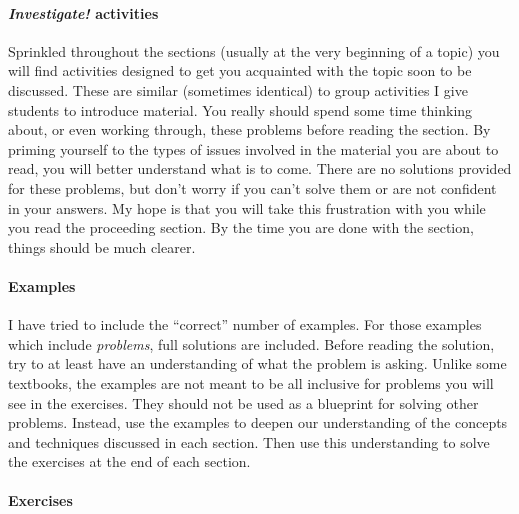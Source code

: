 \documentclass[10pt,]{book}
\theoremstyle{plain}
\theoremstyle{definition}
\theoremstyle{definition}
\theoremstyle{definition}
\numberwithin{equation}{chapter}
\begin{document}
\paragraph[\emph{Investigate!} activities]{\emph{Investigate!} activities}\hypertarget{paragraphs-2}{}

  Sprinkled throughout the sections (usually at the very beginning of a topic) you will find activities designed to get you acquainted with the topic soon to be discussed. These are similar (sometimes identical) to group activities I give students to introduce material. You really should spend some time thinking about, or even working through, these problems before reading the section. By priming yourself to the types of issues involved in the material you are about to read, you will better understand what is to come. There are no solutions provided for these problems, but don't worry if you can't solve them or are not confident in your answers. My hope is that you will take this frustration with you while you read the proceeding section. By the time you are done with the section, things should be much clearer.
\typeout{************************************************}
\typeout{************************************************}
\paragraph[Examples]{Examples}\hypertarget{paragraphs-3}{}

  I have tried to include the ``correct'' number of examples. For those examples which include \emph{problems}, full solutions are included. Before reading the solution, try to at least have an understanding of what the problem is asking. Unlike some textbooks, the examples are not meant to be all inclusive for problems you will see in the exercises. They should not be used as a blueprint for solving other problems. Instead, use the examples to deepen our understanding of the concepts and techniques discussed in each section. Then use this understanding to solve the exercises at the end of each section.
\typeout{************************************************}
\typeout{************************************************}
\paragraph[Exercises]{Exercises}\hypertarget{paragraphs-4}{}
\end{document}
